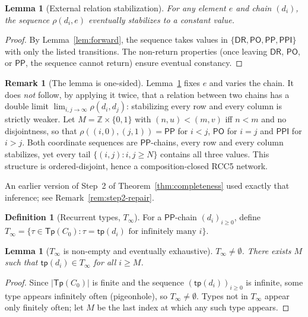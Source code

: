\documentclass[a4paper,11pt]{article}
\newtheorem{lemma}[theorem]{Lemma}
\theoremstyle{definition}
\newtheorem{definition}[theorem]{Definition}
\newtheorem{remark}[theorem]{Remark}
\newcommand{\DR}{\ensuremath{\mathsf{DR}}}
\newcommand{\PO}{\ensuremath{\mathsf{PO}}}
\newcommand{\PP}{\ensuremath{\mathsf{PP}}}
\newcommand{\PPI}{\ensuremath{\mathsf{PPI}}}
\newcommand{\tp}{\ensuremath{\mathsf{tp}}}
\newcommand{\Tp}{\ensuremath{\mathsf{Tp}}}
\begin{document}
\begin{lemma}[External relation stabilization]\label{lem:external}
For any element $e$ and chain $(d_i)$, the sequence
$\rho(d_i, e)$ eventually stabilizes to a constant value.
\end{lemma}

\begin{proof}
By Lemma~\ref{lem:forward}, the sequence takes values in
$\{\DR, \PO, \PP, \PPI\}$ with only the listed transitions.
The non-return properties (once leaving $\DR$, $\PO$, or $\PP$,
the sequence cannot return) ensure eventual constancy.
\end{proof}

\begin{remark}[The lemma is one-sided]\label{rem:one-sided}
Lemma~\ref{lem:external} fixes $e$ and varies the chain.  It does
\emph{not} follow, by applying it twice, that a relation between two
chains has a double limit
$\lim_{i,j\to\infty} \rho(d_i, d_j)$: stabilizing every row and
every column is strictly weaker.  Let
$M = \mathbb{Z}\times\{0,1\}$ with $(n,u) < (m,v)$ iff $n<m$ and
no disjointness, so that
$\rho((i,0),(j,1)) = \PP$ for $i<j$, $\PO$ for $i=j$ and $\PPI$
for $i>j$.  Both coordinate sequences are $\PP$-chains, every row and
every column stabilizes, yet every tail
$\{(i,j) : i,j \ge N\}$ contains all three values.  This structure is
ordered-disjoint, hence a composition-closed RCC5 network.

An earlier version of Step~2 of Theorem~\ref{thm:completeness} used
exactly that inference; see Remark~\ref{rem:step2-repair}.
\end{remark}

\begin{definition}[Recurrent types, $T_\infty$]\label{def:tinf}
For a $\PP$-chain $(d_i)_{i \ge 0}$, define
$T_\infty = \{\tau \in \Tp(C_0) : \tau = \tp(d_i) \text{ for
infinitely many } i\}$.
\end{definition}

\begin{lemma}[$T_\infty$ is non-empty and eventually
exhaustive]\label{lem:tinf}
$T_\infty \ne \emptyset$.  There exists $M$ such that
$\tp(d_i) \in T_\infty$ for all $i \ge M$.
\end{lemma}

\begin{proof}
Since $|\Tp(C_0)|$ is finite and the sequence $(\tp(d_i))_{i \ge 0}$
is infinite, some type appears infinitely often (pigeonhole), so
$T_\infty \ne \emptyset$.  Types not in $T_\infty$ appear only
finitely often; let $M$ be the last index at which any such type
appears.
\end{proof}
\end{document}
